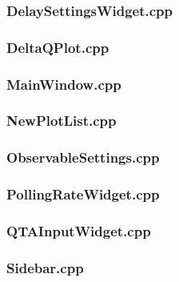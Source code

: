 \subsubsection*{DelaySettingsWidget.cpp}


\subsubsection*{DeltaQPlot.cpp}


\subsubsection*{MainWindow.cpp}


\subsubsection*{NewPlotList.cpp}


\subsubsection*{ObservableSettings.cpp}


\subsubsection*{PollingRateWidget.cpp}


\subsubsection*{QTAInputWidget.cpp}


\subsubsection*{Sidebar.cpp}


